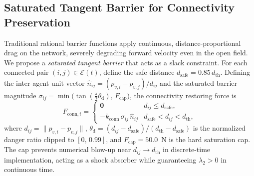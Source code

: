 \documentclass[letterpaper, 10 pt, journal, twoside]{IEEEtran}
\def\scr#1{{\mathcal #1}}
\begin{document}
\subsection{Saturated Tangent Barrier for Connectivity Preservation}
Traditional rational barrier functions \cite{panagou2016ITAC} apply
continuous, distance-proportional drag on the network, severely degrading
forward velocity even in the open field.  We propose a \emph{saturated
tangent barrier} that acts as a slack constraint.  For each connected pair
$(i,j)\in\scr{E}(t)$, define the safe distance $d_{\mathrm{safe}}=0.85\,d_{\mathrm{th}}$.
Defining the inter-agent unit vector
$\hat{n}_{ij}=(p_{v,i}-p_{v,j})/d_{ij}$ and the saturated barrier
magnitude $\sigma_{ij}=\min\!\bigl(\tan(\tfrac{\pi}{2}\theta_{\mathrm{d}}),
\,F_{\mathrm{cap}}\bigr)$, the connectivity restoring force is
\begin{equation}
  F_{\mathrm{conn},i}=
  \begin{cases}
    \mathbf{0}
    & d_{ij}\leq d_{\mathrm{safe}},\\[4pt]
    -k_{\mathrm{conn}}\,\sigma_{ij}\,\hat{n}_{ij}
    & d_{\mathrm{safe}}<d_{ij}<d_{\mathrm{th}},
  \end{cases}
  \label{eq:Fconn}
\end{equation}
where $d_{ij}=\|p_{v,i}-p_{v,j}\|$,
$\theta_{\mathrm{d}}=(d_{ij}-d_{\mathrm{safe}})/(d_{\mathrm{th}}-d_{\mathrm{safe}})$
is the normalized danger ratio clipped to $[0,\,0.99]$, and
$F_{\mathrm{cap}}=50.0$~N is the hard saturation cap.  The cap prevents
numerical blow-up near $d_{ij}\to d_{\mathrm{th}}$ in discrete-time
implementation, acting as a shock absorber while guaranteeing
$\lambda_{2}>0$ in continuous time.
\end{document}
